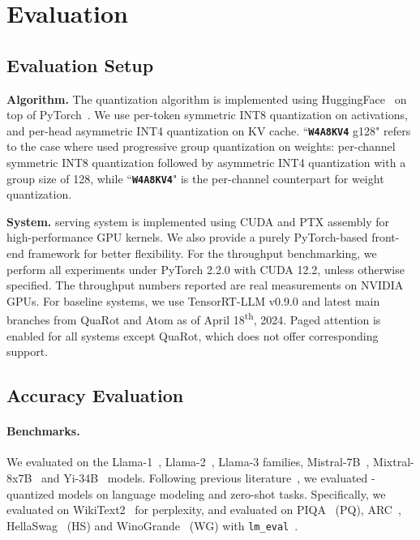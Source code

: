 





\vspace{-5pt}
\section{Evaluation}
\label{sect:evaluation}

\subsection{Evaluation Setup}

\textbf{Algorithm.} The \algo quantization algorithm is implemented using HuggingFace~\cite{transformers} on top of PyTorch~\cite{pytorch}. We use per-token symmetric INT8 quantization on activations, and per-head asymmetric INT4 quantization on KV cache. 
``\textbf{\texttt{W4A8KV4}} g128" refers to the case where \system used progressive group quantization on weights: per-channel symmetric INT8 quantization followed by asymmetric INT4 quantization with a group size of 128, while ``\textbf{\texttt{W4A8KV4}}" is the per-channel counterpart for weight quantization. %

\textbf{System.} \system serving system is implemented using CUDA and PTX assembly for high-performance GPU kernels. We also provide a purely PyTorch-based front-end framework for better flexibility. 
For the throughput benchmarking, we perform all experiments under PyTorch 2.2.0 with CUDA 12.2, unless otherwise specified. The throughput numbers reported are real measurements on NVIDIA GPUs. For baseline systems, we use TensorRT-LLM v0.9.0 and latest main branches from QuaRot and Atom as of April 18\textsuperscript{th}, 2024. Paged attention is enabled for all systems except QuaRot, which does not offer corresponding support.

\subsection{Accuracy Evaluation}


\paragraph{Benchmarks.}
We evaluated \algo on the Llama-1~\cite{touvron2023llama}, Llama-2~\cite{touvron2023llama2}, Llama-3 families, Mistral-7B~\cite{jiang2023mistral}, Mixtral-8x7B~\cite{jiang2024mixtral} and Yi-34B~\cite{ai2024yi} models. Following previous literature~\cite{llmint8,gptq,zhao2023atom,ashkboos2024quarot, xiao2023smoothquant,lin2023awq}, we evaluated \algo-quantized models on language modeling and zero-shot tasks. Specifically, we evaluated on WikiText2~\cite{wikitext} for perplexity, and evaluated on PIQA~\cite{piqa} (PQ), ARC~\cite{arc}, HellaSwag~\cite{hellaswag} (HS) and WinoGrande~\cite{sakaguchi2019winogrande} (WG) with \texttt{lm\_eval}~\cite{eval-harness}.

